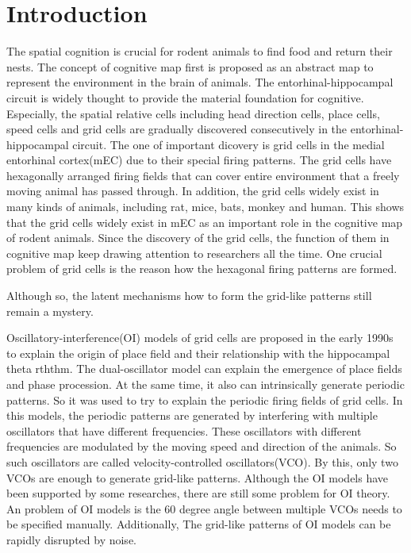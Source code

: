 \documentclass[final,5p,times,twocolumn]{elsarticle}
\begin{document}
\section{Introduction}
The spatial cognition is crucial for rodent animals to find food and return their nests. The concept of cognitive map first is proposed as an abstract map to represent the environment in the brain of animals\citep{Tolman1948}. The entorhinal-hippocampal circuit is widely thought to provide the material foundation for cognitive\citep{McNaughton2006}. Especially, the spatial relative cells including head direction cells, place cells, speed cells and grid cells are gradually discovered consecutively in the entorhinal-hippocampal circuit. The one of important dicovery is grid cells in the medial entorhinal cortex(mEC)\citep{Moser2017} due to their special firing patterns. The grid cells have hexagonally arranged firing fields that can cover entire environment that a freely moving animal has passed through\citep{Rowland2016}. In addition, the grid cells widely exist in many kinds of animals, including rat, mice\citep{Fyhn2008}, bats\citep{Yartsev2011}, monkey\citep{Killian2012} and human\citep{Jacobs2013,Kunz2015,Doeller2010}. This shows that the grid cells widely exist in mEC as an important role in the cognitive map of rodent animals. Since the discovery of the grid cells, the function of them in cognitive map keep drawing attention to researchers all the time. One crucial problem of grid cells is the reason how the hexagonal firing patterns are formed.




Although so, the latent mechanisms how to form the grid-like patterns still remain a mystery\citep{DAlbis2017}.


Oscillatory-interference(OI) models of grid cells are proposed in the early 1990s to explain the origin of place field and their relationship with the hippocampal theta rththm\citep{OKeefe2005,Burgess2007,Hasselmo2007,Pastoll2013,Burgess2008}. The dual-oscillator model can explain the emergence of place fields and phase procession\citep{OKeefe2005}. At the same time, it also can intrinsically generate periodic patterns. So it was used to try to explain the periodic firing fields of grid cells\citep{DAlbis2018}. In this models, the periodic patterns are generated by interfering with multiple oscillators that have different frequencies. These oscillators with different frequencies are modulated by the moving speed and direction of the animals. So such oscillators are called velocity-controlled oscillators(VCO). By this, only two VCOs are enough to generate grid-like patterns. 
Although the OI models have been supported by some researches\citep{Schmidt-Hieber2013,Domnisoru2013,Welday2011,Koenig2011,Brandon2011,Giocomo2007,Hafting2005,Alonso1989}, there are still some problem for OI theory. An problem of OI models is the 60 degree angle between multiple VCOs needs to be specified manually. Additionally, The grid-like patterns of OI models can be rapidly disrupted by noise\citep{DAlbis2018}.
\end{document}
